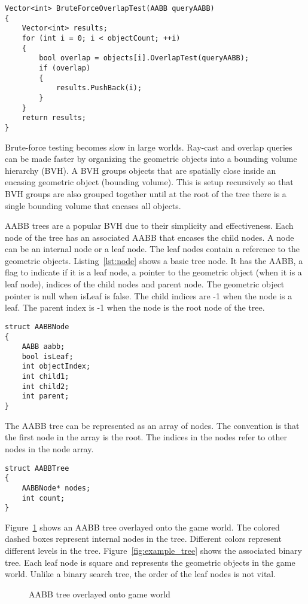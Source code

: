 \documentclass{article}
\begin{document}
\begin{lstlisting}[caption={Brute-force overlap test}, label={lst:brute_overlap}, float]
Vector<int> BruteForceOverlapTest(AABB queryAABB)
{
	Vector<int> results;
	for (int i = 0; i < objectCount; ++i)
	{
		bool overlap = objects[i].OverlapTest(queryAABB);
		if (overlap)
		{
			results.PushBack(i);
		}
	}
	return results;
}
\end{lstlisting}

Brute-force testing becomes slow in large worlds. Ray-cast and overlap queries can be made faster by organizing the geometric objects into a bounding volume hierarchy (BVH). A BVH groups objects that are spatially close inside an encasing geometric object (bounding volume). This is setup recursively so that BVH groups are also grouped together until at the root of the tree there is a single bounding volume that encases all objects.

AABB trees are a popular BVH due to their simplicity and effectiveness. Each node of the tree has an associated AABB that encases the child nodes. A node can be an internal node or a leaf node. The leaf nodes contain a reference to the geometric objects. Listing~\ref{lst:node} shows a basic tree node. It has the AABB, a flag to indicate if it is a leaf node, a pointer to the geometric object (when it is a leaf node), indices of the child nodes and parent node. The geometric object pointer is null when isLeaf is false. The child indices are -1 when the node is a leaf. The parent index is -1 when the node is the root node of the tree.
\begin{lstlisting}[caption={AABB tree node}, label={lst:node}, float]
struct AABBNode
{
	AABB aabb;
	bool isLeaf;
	int objectIndex;
	int child1;
	int child2;
	int parent;
}
\end{lstlisting}

The AABB tree can be represented as an array of nodes. The convention is that the first node in the array is the root. The indices in the nodes refer to other nodes in the node array.

\begin{lstlisting}[caption={AABB tree}, label={lst:tree}, float]
struct AABBTree
{
	AABBNode* nodes;
	int count;
}
\end{lstlisting}

Figure~\ref{fig:overlay} shows an AABB tree overlayed onto the game world. The colored dashed boxes represent internal nodes in the tree. Different colors represent different levels in the tree. Figure~\ref{fig:example_tree} shows the associated binary tree. Each leaf node is square and represents the geometric objects in the game world. Unlike a binary search tree, the order of the leaf nodes is not vital.
\begin{figure}
	\begin{center}
		
	\end{center}
	\caption{AABB tree overlayed onto game world}
	\label{fig:overlay}
\end{figure}
\end{document}
